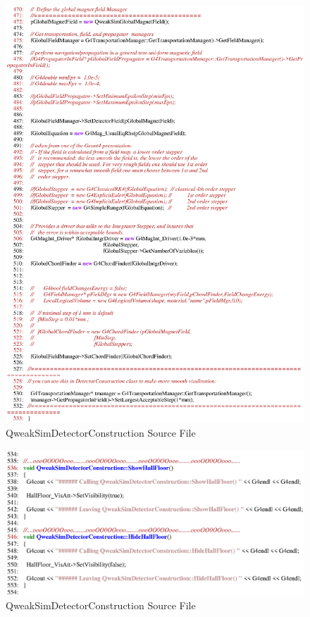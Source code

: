 \begin{figure}[ht]
  \hspace{0cm}
  \includegraphics[scale=0.8]{./figures4/QweakSimDetectorConstruction.cc-p8.eps}
  \caption{QweakSimDetectorConstruction Source File}
           \label{fig:V-SC-12}
\end{figure}
\clearpage

\begin{figure}[ht]
  \hspace{0cm}
  \includegraphics[scale=0.8]{./figures4/QweakSimDetectorConstruction.cc-p9.eps}
  \caption{QweakSimDetectorConstruction Source File}
           \label{fig:V-SC-13}
\end{figure}
\clearpage
